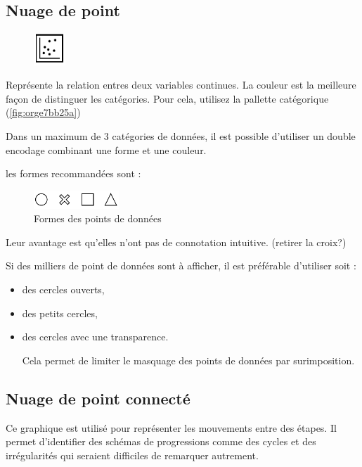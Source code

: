 \documentclass[a4paper,12pt]{article}
\begin{document}
\begin{multicols}{2}
\subsection*{Nuage de point}
\label{sec:orgc599b47}
\begin{figure}
\centering
\includegraphics[width=1.2cm]{./img/icon-scatterplot.pdf}
\end{figure}

Représente la relation entres deux variables continues. \autocite{alansmithLexiqueVisuel}
La couleur est la meilleure façon de distinguer les catégories.\autocite{stephenfewComponentlevelGraphDesign2012} Pour cela, utilisez la pallette catégorique (\ref{fig:orge7bb25a})

Dans un maximum de 3 catégories de données, il est possible d'utiliser un double encodage combinant une forme et une couleur.\autocite{andreaskrauseBestPracticesData2024}

les formes recommandées sont :

\begin{figure}[H]
\centering
\includegraphics[width=3.2cm]{./img/formes.pdf}
\caption{\label{fig:orgc54ff71}Formes des points de données}
\end{figure}

Leur avantage est qu'elles n'ont pas de connotation intuitive.\autocite{andreaskrauseBestPracticesData2024} (retirer la croix?)

Si des milliers de point de données sont à afficher, il est préférable d'utiliser soit :
\begin{itemize}
\item des cercles ouverts,
\item des petits cercles,\autocite{stephenfewComponentlevelGraphDesign2012}
\item des cercles avec une transparence.\autocite{stephenfewComponentlevelGraphDesign2012}

Cela permet de limiter le masquage des points de données par surimposition. \autocite{andreaskrauseBestPracticesData2024}
\end{itemize}
\subsection*{Nuage de point connecté}
\label{sec:org28dc28b}
Ce graphique est utilisé pour représenter les mouvements entre des étapes. Il permet d'identifier des schémas de progressions comme des cycles et des irrégularités qui seraient difficiles de remarquer autrement. \autocite{wilkeVisualizingTimeSeries2019}


\end{multicols}
\end{document}
